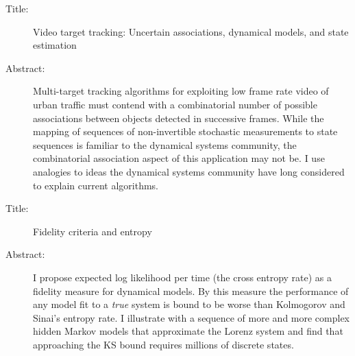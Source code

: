 \documentclass{article}
\begin{document}
\begin{description}
\item[Title:] Video target tracking: Uncertain associations, dynamical
  models, and state estimation
\item[Abstract:] %
  Multi-target tracking algorithms for exploiting low frame rate video
  of urban traffic must contend with a combinatorial number of
  possible associations between objects detected in successive frames.
  While the mapping of sequences of non-invertible stochastic
  measurements to state sequences is familiar to the dynamical systems
  community, the combinatorial association aspect of this application
  may not be.  I use analogies to ideas the dynamical systems
  community have long considered to explain current algorithms.
\item[Title:] Fidelity criteria and entropy
\item[Abstract:] %
  I propose expected log likelihood per time (the cross entropy rate)
  as a fidelity measure for dynamical models.  By this measure the
  performance of any model fit to a \emph{true} system is bound to be
  worse than Kolmogorov and Sinai's entropy rate.  I illustrate with a
  sequence of more and more complex hidden Markov models that
  approximate the Lorenz system and find that approaching the KS bound
  requires millions of discrete states.
\end{description}
\end{document}
